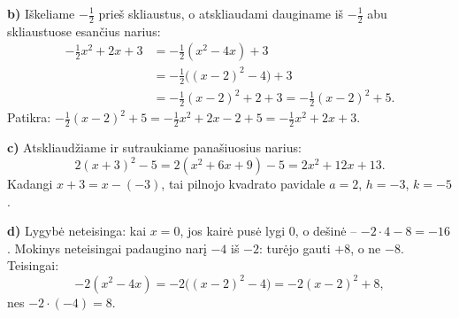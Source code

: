 \documentclass[12pt,a4paper]{article}
\begin{document}
\begin{enumerate}
\textbf{b)} Iškeliame $-\frac12$ prieš skliaustus, o atskliaudami dauginame iš $-\frac12$ abu skliaustuose esančius narius:
\[
\begin{aligned}
-\frac12x^2+2x+3&=-\frac12(x^2-4x)+3\\
&=-\frac12\bigl((x-2)^2-4\bigr)+3\\
&=-\frac12(x-2)^2+2+3=-\frac12(x-2)^2+5.
\end{aligned}
\]
Patikra: $-\frac12(x-2)^2+5=-\frac12x^2+2x-2+5=-\frac12x^2+2x+3$.

\textbf{c)} Atskliaudžiame ir sutraukiame panašiuosius narius:
\[
2(x+3)^2-5=2(x^2+6x+9)-5=2x^2+12x+13.
\]
Kadangi $x+3=x-(-3)$, tai pilnojo kvadrato pavidale $a=2$, $h=-3$, $k=-5$.

\textbf{d)} Lygybė neteisinga: kai $x=0$, jos kairė pusė lygi $0$, o dešinė – $-2\cdot4-8=-16$. Mokinys neteisingai padaugino narį $-4$ iš $-2$: turėjo gauti $+8$, o ne $-8$. Teisingai:
\[
-2(x^2-4x)=-2\bigl((x-2)^2-4\bigr)=-2(x-2)^2+8,
\]
nes $-2\cdot(-4)=8$.
\end{enumerate}
\end{document}

